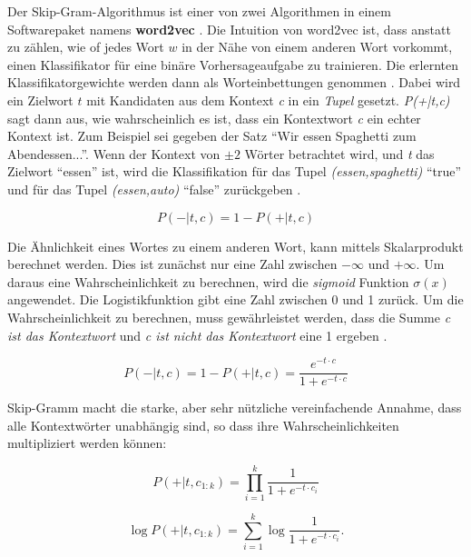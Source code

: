 Der Skip-Gram-Algorithmus ist einer von zwei Algorithmen in einem Softwarepaket namens \textbf{word2vec} \cite*{Mikolov2013}\cite*{Mikolov}. Die Intuition von word2vec ist, dass anstatt zu zählen, wie of jedes Wort $w$ in der Nähe von einem anderen Wort vorkommt, einen Klassifikator für eine binäre Vorhersageaufgabe zu trainieren. Die erlernten Klassifikatorgewichte werden dann als Worteinbettungen genommen \cite*[111]{Jurafskya}. Dabei wird ein Zielwort $t$ mit Kandidaten aus dem Kontext \textit{c} in ein \textit{Tupel} gesetzt. \textit{P(+|t,c)} sagt dann aus, wie wahrscheinlich es ist, dass ein Kontextwort \textit{c} ein echter Kontext ist. Zum Beispiel sei gegeben der Satz \enquote{Wir essen Spaghetti zum Abendessen...}. Wenn der Kontext von $\pm 2$ Wörter betrachtet wird, und \textit{t} das Zielwort \enquote{essen} ist, wird die Klassifikation für das Tupel \textit{(essen,spaghetti)} \enquote{true} und für das Tupel \textit{(essen,auto)} \enquote{false} zurückgeben \cite*[111]{Jurafskya}.

\begin{equation} \label{Formel3_1}
    P(-|t,c) = 1-P(+|t,c)
\end{equation}

Die Ähnlichkeit eines Wortes zu einem anderen Wort, kann mittels Skalarprodukt berechnet werden. Dies ist zunächst nur eine Zahl zwischen $-\infty$ und $+\infty$. Um daraus eine Wahrscheinlichkeit zu berechnen, wird die \textit{sigmoid} Funktion $\sigma(x)$ angewendet. Die Logistikfunktion gibt eine Zahl zwischen 0 und 1 zurück. Um die Wahrscheinlichkeit zu berechnen, muss gewährleistet werden, dass die Summe \textit{c ist das Kontextwort} und \textit{c ist nicht das Kontextwort} eine 1 ergeben \cite*[112]{Jurafskya}.

\begin{equation} \label{Formel3_2}
    P(-|t,c) = 1-P(+|t,c) = \frac{e^{-t\cdot c}}{1+e^{-t\cdot c}}
\end{equation}

Skip-Gramm macht die starke, aber sehr nützliche vereinfachende Annahme, dass alle Kontextwörter unabhängig sind, so dass ihre Wahrscheinlichkeiten multipliziert werden können:

\begin{equation} \label{Formel3_3}
    P(+|t,c_{1:k}) = \prod ^{k}_{i=1}\frac{1}{1+e^{-t\cdot c_{i}}}
\end{equation}

\begin{equation} \label{Formel3_4}
    \log P(+|t,c_{1:k}) =\sum ^{k}_{i=1} \log \frac{1}{1+e^{-t\cdot c_{i}}}.
\end{equation}



